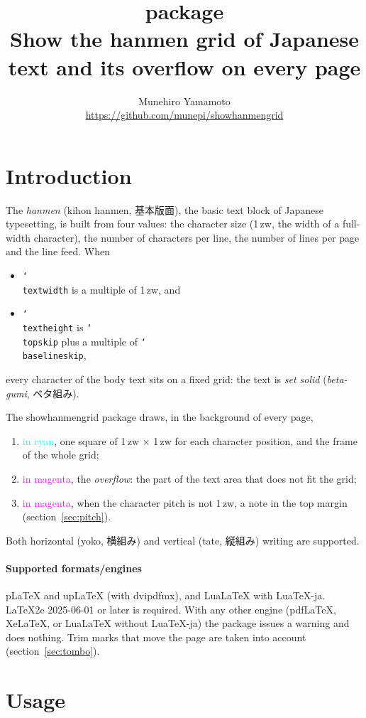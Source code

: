 \documentclass{article}
\title{\pkg{showhanmengrid} package\\
  \large Show the hanmen grid of Japanese text and its overflow on every page}
\author{Munehiro Yamamoto\\
  \url{https://github.com/munepi/showhanmengrid}}
\date{\shgversion}
\newcommand*\cs[1]{\texttt{\char`\\#1}}
\newcommand*\pkg[1]{\textsf{#1}}
\begin{document}
\maketitle

\section{Introduction}

The \emph{hanmen} (kihon hanmen, 基本版面), the basic text block of
Japanese typesetting, is built from four values: the character size
(1\,zw, the width of a full-width character), the number of characters
per line, the number of lines per page and the line feed.  When
\begin{itemize}
\item \cs{textwidth} is a multiple of 1\,zw, and
\item \cs{textheight} is \cs{topskip} plus a multiple of
  \cs{baselineskip},
\end{itemize}
every character of the body text sits on a fixed grid: the text is
\emph{set solid} (\emph{beta-gumi}, ベタ組み).

The \pkg{showhanmengrid} package draws, in the background of every page,
\begin{enumerate}
\item \textcolor{cyan}{in cyan}, one square of 1\,zw $\times$ 1\,zw for
  each character position, and the frame of the whole grid;
\item \textcolor{magenta}{in magenta}, the \emph{overflow}: the part of
  the text area that does not fit the grid;
\item \textcolor{magenta}{in magenta}, when the character pitch is not
  1\,zw, a note in the top margin (section~\ref{sec:pitch}).
\end{enumerate}
Both horizontal (yoko, 横組み) and vertical (tate, 縦組み) writing are
supported.

\paragraph{Supported formats/engines}
pLaTeX and upLaTeX (with dvipdfmx), and LuaLaTeX with LuaTeX-ja.
LaTeX2e 2025-06-01 or later is required.  With any other engine
(pdfLaTeX, XeLaTeX, or LuaLaTeX without LuaTeX-ja) the package issues a
warning and does nothing.  Trim marks that move the page are taken into
account (section~\ref{sec:tombo}).

\section{Usage}
\end{document}
